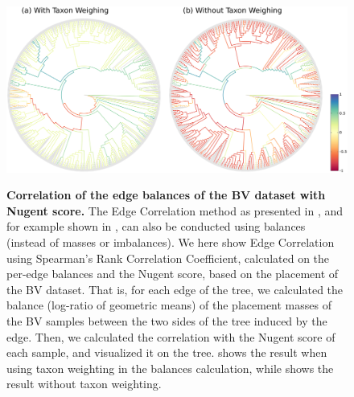 \begin{figure}[!htb]
    \centering
    \includegraphics[width=\linewidth]{pdf/bv_place_edge_balances_correlation.pdf}
    \begin{subfigure}{0pt}
        \label{fig:bv_place_edge_balances_correlation:sub:with_taxon_weighting}
    \end{subfigure}
    \begin{subfigure}{0pt}
        \label{fig:bv_place_edge_balances_correlation:sub:without_taxon_weighting}
    \end{subfigure}
    \caption[Correlation of the edge balances of the \acs{BV} dataset with Nugent score]{
        \textbf{Correlation of the edge balances of the \ac{BV} dataset with Nugent score.}
        The Edge Correlation method as presented in ,
        and for example shown in ,
        can also be conducted using balances (instead of masses or imbalances).
        We here show Edge Correlation using Spearman's Rank Correlation Coefficient,
        calculated on the per-edge balances and the Nugent score, based on the placement of the \ac{BV} dataset.
        That is, for each edge of the tree, we calculated the balance (log-ratio of geometric means)
        of the placement masses of the \ac{BV} samples between the two sides of the tree induced by the edge.
        Then, we calculated the correlation with the Nugent score of each sample, and visualized it on the tree.
         shows the result when
        using taxon weighting \cite{Silverman2017} in the balances calculation,
        while  shows the result
        without taxon weighting.
    }
    \label{fig:bv_place_edge_balances_correlation}
\end{figure}

